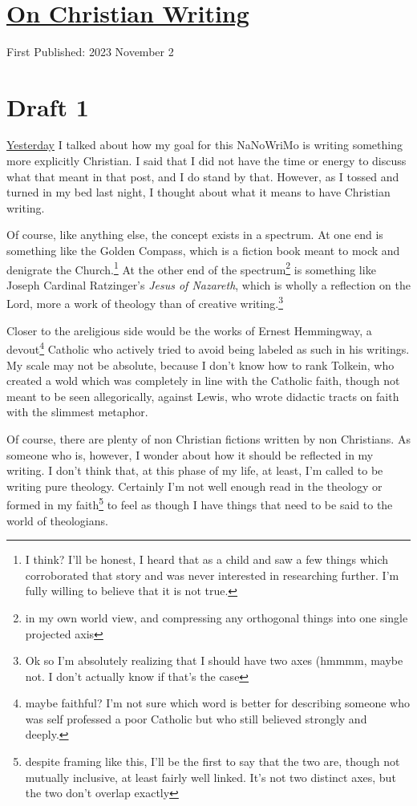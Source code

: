 \documentclass[12pt]{article}[titlepage]
\newcommand{\1}{\={a}}
\newcommand{\2}{\={e}}
\newcommand{\3}{\={\i}}
\newcommand{\4}{\=o}
\newcommand{\5}{\=u}
\newcommand{\6}{\={A}}
\renewcommand{\,}{\textsuperscript{,}}
\begin{document}

\doublespacing
\section{\href{christian-writing.html}{On Christian Writing}}
First Published: 2023 November 2
\section{Draft 1}
\href{nanowrimo-5.html}{Yesterday} I talked about how my goal for this NaNoWriMo is writing something more explicitly Christian.
I said that I did not have the time or energy to discuss what that meant in that post, and I do stand by that.
However, as I tossed and turned in my bed last night, I thought about what it means to have Christian writing.

Of course, like anything else, the concept exists in a spectrum.
At one end is something like the Golden Compass, which is a fiction book meant to mock and denigrate the Church.\footnote{I think? I'll be honest, I heard that as a child and saw a few things which corroborated that story and was never interested in researching further.
I'm fully willing to believe that it is not true.}
At the other end of the spectrum\footnote{in my own world view, and compressing any orthogonal things into one single projected axis} is something like Joseph Cardinal Ratzinger's \textit{Jesus of Nazareth}, which is wholly a reflection on the Lord, more a work of theology than of creative writing.\footnote{Ok so I'm absolutely realizing that I should have two axes (hmmmm, maybe not. I don't actually know if that's the case}

Closer to the areligious side would be the works of Ernest Hemmingway, a devout\footnote{maybe faithful? I'm not sure which word is better for describing someone who was self professed a poor Catholic but who still believed strongly and deeply.} Catholic who actively tried to avoid being labeled as such in his writings.
My scale may not be absolute, because I don't know how to rank Tolkein, who created a wold which was completely in line with the Catholic faith, though not meant to be seen allegorically, against Lewis, who wrote didactic tracts on faith with the slimmest metaphor.

Of course, there are plenty of non Christian fictions written by non Christians.
As someone who is, however, I wonder about how it should be reflected in my writing.
I don't think that, at this phase of my life, at least, I'm called to be writing pure theology.
Certainly I'm not well enough read in the theology or formed in my faith\footnote{despite framing like this, I'll be the first to say that the two are, though not mutually inclusive, at least fairly well linked. It's not two distinct axes, but the two don't overlap exactly} to feel as though I have things that need to be said to the world of theologians.
\end{document}
